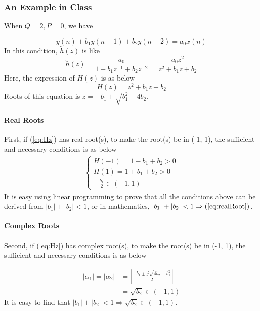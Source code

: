 \documentclass{article}
\begin{document}
\subsubsection{An Example in Class}
When $Q = 2, P = 0$, we have

\begin{equation}
y(n) + b_1y(n - 1) + b_2y(n - 2) = a_0 x(n)
\label{eq:yxExample}
\end{equation}
In this condition, $\tilde{h}(z)$ is like 
\begin{equation}
\tilde{h}(z) = \frac{a_0}{1 + b_1 z^{-1} + b_2 z^{-2}} = \frac{a_0 z^2}{z^2 + b_1 z + b_2}
\label{eq:hzExample}
\end{equation}
Here, the expression of $H(z)$ is as below
\begin{equation}
H(z) = z^2 + b_1 z + b_2
\label{eq:Hz}
\end{equation}
Roots of this equation is $z = -b_1 \pm \sqrt{b_1^2 - 4 b_2}$.

\paragraph{Real Roots}
First, if (\ref{eq:Hz}) has real root(s), to make the root(s) be in (-1, 1), the sufficient and necessary conditions is as below
\begin{equation}
	\begin{aligned}
		\begin{cases}
			H(-1) = 1 - b_1 + b_2 > 0 \\ 
			H(1) = 1 + b_1 + b_2 > 0 \\ 
			- \frac{b_1}{2} \in (-1, 1)
		\end{cases}
	\end{aligned}
	\label{eq:realRoot}
\end{equation}
It is easy using linear programming to prove that all the conditions above can be derived from $|b_1| + |b_2| < 1$, or in mathematics, $|b_1| + |b_2| < 1 \Rightarrow (\ref{eq:realRoot})$.

\paragraph{Complex Roots}
Second, if (\ref{eq:Hz}) has complex root(s), to make the root(s) be in (-1, 1), the sufficient and necessary conditions is as below

\begin{align*}
		|\alpha_1| = |\alpha_2| &= |\frac{-b_1 \pm j\sqrt{4b_2 - b_1^2}}{2}| \\ 
		&= \sqrt{b_2} \in (-1, 1)
\end{align*}
It is easy to find that $|b_1| + |b_2| < 1 \Rightarrow \sqrt{b_2} \in (-1, 1)$. 
\end{document}

